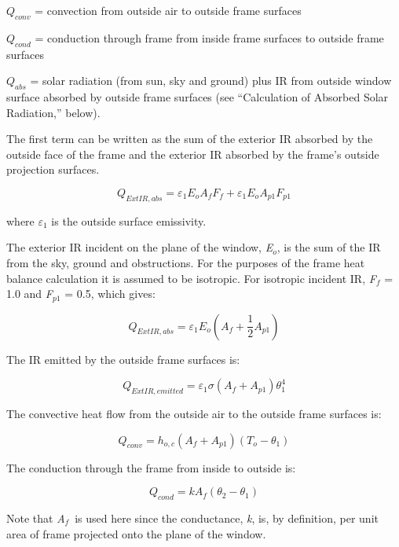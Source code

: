\({Q_{conv}}\) = convection from outside air to outside frame surfaces

\({Q_{cond}}\) = conduction through frame from inside frame surfaces to outside frame surfaces

\({Q_{abs}}\) = solar radiation (from sun, sky and ground) plus IR from outside window surface absorbed by outside frame surfaces (see ``Calculation of Absorbed Solar Radiation,'' below).

The first term can be written as the sum of the exterior IR absorbed by the outside face of the frame and the exterior IR absorbed by the frame's outside projection surfaces.

\begin{equation}
{Q_{ExtIR,abs}} = {\varepsilon_1}{E_o}{A_f}{F_f} + {\varepsilon_1}{E_o}{A_{p1}}{F_{p1}}
\end{equation}

where \emph{\(\varepsilon\)\(_{1}\)} is the outside surface emissivity.

The exterior IR incident on the plane of the window, \emph{E\(_{o}\)}, is the sum of the IR from the sky, ground and obstructions. For the purposes of the frame heat balance calculation it is assumed to be isotropic. For isotropic incident IR, \emph{F\(_{f}\)} = 1.0 and \emph{F\(_{p1}\)} = 0.5, which gives:

\begin{equation}
{Q_{ExtIR,abs}} = {\varepsilon_1}{E_o}({A_f} + \frac{1}{2}{A_{p1}})
\end{equation}

The IR emitted by the outside frame surfaces is:

\begin{equation}
{Q_{ExtIR,emitted}} = {\varepsilon_1}\sigma ({A_f} + {A_{p1}})\theta_1^4
\end{equation}

The convective heat flow from the outside air to the outside frame surfaces is:

\begin{equation}
{Q_{conv}} = {h_{o,c}}({A_f} + {A_{p1}})({T_o} - {\theta_1})
\end{equation}

The conduction through the frame from inside to outside is:

\begin{equation}
{Q_{cond}} = k{A_f}({\theta_2} - {\theta_1})
\end{equation}

Note that \emph{A\(_{f}\)}~is used here since the conductance, \emph{k}, is, by definition, per unit area of frame projected onto the plane of the window.


